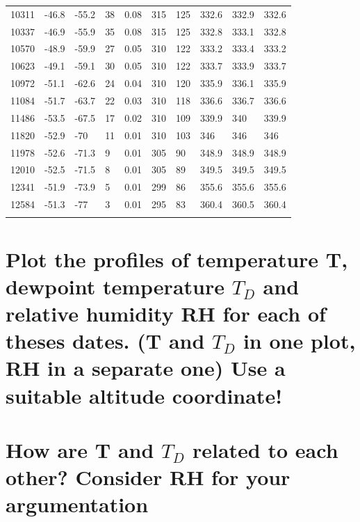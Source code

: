 \documentclass{article}
\begin{document}
{\begin{longtable}[h!]{p{}|p{}|p{}|p{}|p{}|p{}|p{}|p{}|p{}|p{}}
    10311 & -46.8 & -55.2 & 38 & 0.08 & 315 & 125 & 332.6 & 332.9 & 332.6 \\
    10337 & -46.9 & -55.9 & 35 & 0.08 & 315 & 125 & 332.8 & 333.1 & 332.8 \\
    10570 & -48.9 & -59.9 & 27 & 0.05 & 310 & 122 & 333.2 & 333.4 & 333.2 \\
    10623 & -49.1 & -59.1 & 30 & 0.05 & 310 & 122 & 333.7 & 333.9 & 333.7 \\
    10972 & -51.1 & -62.6 & 24 & 0.04 & 310 & 120 & 335.9 & 336.1 & 335.9 \\
    11084 & -51.7 & -63.7 & 22 & 0.03 & 310 & 118 & 336.6 & 336.7 & 336.6 \\
    11486 & -53.5 & -67.5 & 17 & 0.02 & 310 & 109 & 339.9 & 340 & 339.9 \\
    11820 & -52.9 & -70 & 11 & 0.01 & 310 & 103 & 346 & 346 & 346 \\
    11978 & -52.6 & -71.3 & 9 & 0.01 & 305 & 90 & 348.9 & 348.9 & 348.9 \\
    12010 & -52.5 & -71.5 & 8 & 0.01 & 305 & 89 & 349.5 & 349.5 & 349.5 \\
    12341 & -51.9 & -73.9 & 5 & 0.01 & 299 & 86 & 355.6 & 355.6 & 355.6 \\
    12584 & -51.3 & -77 & 3 & 0.01 & 295 & 83 & 360.4 & 360.5 & 360.4 \\

  \label{tab:addlabel}%
\end{longtable}}%







\newpage
\section{Plot the profiles of temperature T, dewpoint temperature $T_D$ and relative humidity RH for each of theses dates. (T and $T_D$ in one plot, RH in a separate one) Use a suitable altitude coordinate!}



\newpage
\section{How are T and $T_D$ related to each other? Consider RH for your argumentation}
\end{document}
